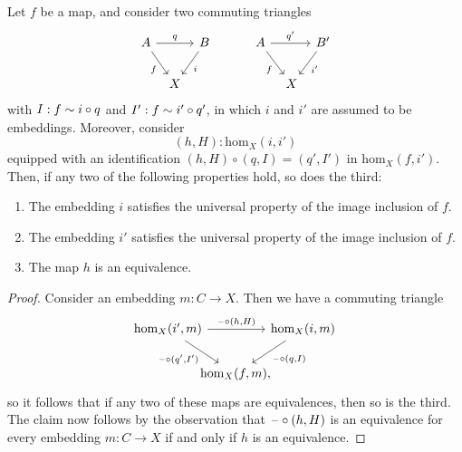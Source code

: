 \begin{prp}
  Let $f$ be a map, and consider two commuting triangles
  \begin{equation*}
    \begin{tikzcd}[column sep=tiny]
      A \arrow[dr,swap,"f"] \arrow[rr,"q"] & & B \arrow[dl,"i"] &[2em] A \arrow[dr,swap,"f"] \arrow[rr,"{q'}"] & & B' \arrow[dl,"{i'}"] \\
      & X & & \phantom{B'} & X
    \end{tikzcd}
  \end{equation*}
  with $I:f\sim i\circ q$ and $I':f\sim i'\circ q'$, in which $i$ and $i'$ are assumed to be embeddings. Moreover, consider
  \begin{equation*}
    (h,H):\mathrm{hom}_X(i,i')
  \end{equation*}
  equipped with an identification $(h,H)\circ(q,I)=(q',I')$ in $\mathrm{hom}_X(f,i')$. Then, if any two of the following properties hold, so does the third:
  \begin{enumerate}
  \item The embedding $i$ satisfies the universal property of the image inclusion of $f$.
  \item The embedding $i'$ satisfies the universal property of the image inclusion of $f$.
  \item The map $h$ is an equivalence.
  \end{enumerate}
\end{prp}

\begin{proof}
  Consider an embedding $m:C\to X$. Then we have a commuting triangle
  \begin{equation*}
    \begin{tikzcd}[column sep=-1em]
      \mathrm{hom}_X(i',m) \arrow[rr,"{\blank\circ(h,H)}"] \arrow[dr,swap,"{\blank\circ(q',I')}"] & & \mathrm{hom}_X(i,m) \arrow[dl,"{\blank\circ(q,I)}"] \\
      & \mathrm{hom}_X(f,m), & \phantom{\mathrm{hom}_X(i',m)}
    \end{tikzcd}
  \end{equation*}
  so it follows that if any two of these maps are equivalences, then so is the third. The claim now follows by the observation that $\mathord{\hspace{1pt}\text{--}\hspace{1pt}}\circ(h,H)$ is an equivalence for every embedding $m:C\to X$ if and only if $h$ is an equivalence.
\end{proof}


